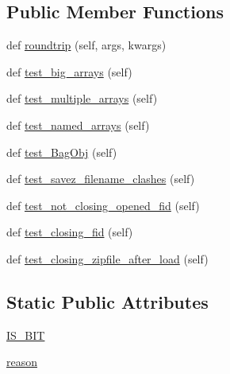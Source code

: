 \subsection*{Public Member Functions}
\begin{DoxyCompactItemize}
\item 
def \hyperlink{classnumpy_1_1lib_1_1tests_1_1test__io_1_1TestSavezLoad_ac44407069240c5e5016c2920ad5f2b43}{roundtrip} (self, args, kwargs)
\item 
def \hyperlink{classnumpy_1_1lib_1_1tests_1_1test__io_1_1TestSavezLoad_aeaf7c48f97cec233285cf9298b8341ce}{test\+\_\+big\+\_\+arrays} (self)
\item 
def \hyperlink{classnumpy_1_1lib_1_1tests_1_1test__io_1_1TestSavezLoad_a983994f66cc58aea56e3abb2f804369c}{test\+\_\+multiple\+\_\+arrays} (self)
\item 
def \hyperlink{classnumpy_1_1lib_1_1tests_1_1test__io_1_1TestSavezLoad_a080b487e8e0a74d1d26637b5a729d915}{test\+\_\+named\+\_\+arrays} (self)
\item 
def \hyperlink{classnumpy_1_1lib_1_1tests_1_1test__io_1_1TestSavezLoad_a98b53cbec1050b9fc5725b822e52ad78}{test\+\_\+\+Bag\+Obj} (self)
\item 
def \hyperlink{classnumpy_1_1lib_1_1tests_1_1test__io_1_1TestSavezLoad_a624c37da32d53ed24fcefb06c4db0d60}{test\+\_\+savez\+\_\+filename\+\_\+clashes} (self)
\item 
def \hyperlink{classnumpy_1_1lib_1_1tests_1_1test__io_1_1TestSavezLoad_a4e3985e96aa1ad83c005ff7a622f82a0}{test\+\_\+not\+\_\+closing\+\_\+opened\+\_\+fid} (self)
\item 
def \hyperlink{classnumpy_1_1lib_1_1tests_1_1test__io_1_1TestSavezLoad_ae3bc983761b3d5438a996615b90c9a46}{test\+\_\+closing\+\_\+fid} (self)
\item 
def \hyperlink{classnumpy_1_1lib_1_1tests_1_1test__io_1_1TestSavezLoad_a0ebcee3a09f12ed14438ed932441bf3b}{test\+\_\+closing\+\_\+zipfile\+\_\+after\+\_\+load} (self)
\end{DoxyCompactItemize}
\subsection*{Static Public Attributes}
\begin{DoxyCompactItemize}
\item 
\hyperlink{classnumpy_1_1lib_1_1tests_1_1test__io_1_1TestSavezLoad_aef75a225bd38ebb69cea2a00ec5cd194}{I\+S\+\_\+B\+IT}
\item 
\hyperlink{classnumpy_1_1lib_1_1tests_1_1test__io_1_1TestSavezLoad_a1f4cb6e483fbd6c73b8a78205fa4ff5c}{reason}
\end{DoxyCompactItemize}
